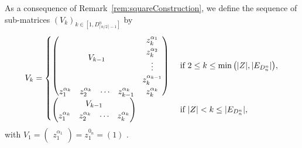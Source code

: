 \documentclass[11pt]{llncs}
\begin{document}
\begin{definition}\label{def:inductiveConstructionOfV}
    As a consequence of Remark~\ref{rem:squareConstruction}, we define the sequence of sub-matrices $\left(V_k\right)_{k\in [1,D_{\lceil{n/2}\rceil-1}^n]}$ by
    \begin{align*}
        V_k = 
        \begin{cases}
            \begin{pmatrix}
        \multicolumn{4}{c}{\multirow{4}{*}{$V_{k-1}$}} & z_k^{\alpha_{1}}\\
        & & & & z_k^{\alpha_{2}}\\
        & & & & \vdots\\
        & & & & z_k^{\alpha_{k-1}}\\
        z_1^{\alpha_{k}} & z_{2}^{\alpha_k}& \cdots & z_{k-1}^{\alpha_{k}} & z_{k}^{\alpha_{k}}
    \end{pmatrix} & \mbox{ if } 2\leq k \leq \min{\left(|Z|, |E_{D_n^n}|\right)},\\
    \begin{pmatrix}
        \multicolumn{4}{c}{\multirow{1}{*}{$V_{k-1}$}} \\
        z_1^{\alpha_k} & z_2^{\alpha_k} & \cdots & z_{k}^{\alpha_k}
    \end{pmatrix} & \mbox{ if } |Z| < k \leq |E_{D_n^n}|,
        \end{cases}
    \end{align*}
    with $V_1 = \begin{pmatrix} z_1^{\alpha_1}\end{pmatrix} = z_1^{0_n} = (1)$ .
\end{definition}
\end{document}
